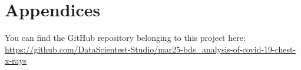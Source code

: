 \documentclass{article}
\begin{document}
\newpage

\section{Appendices}

You can find the GitHub repository belonging to this project here: \\
\url{https://github.com/DataScientest-Studio/mar25-bds_analysis-of-covid-19-chest-x-rays}\\




\end{document}
